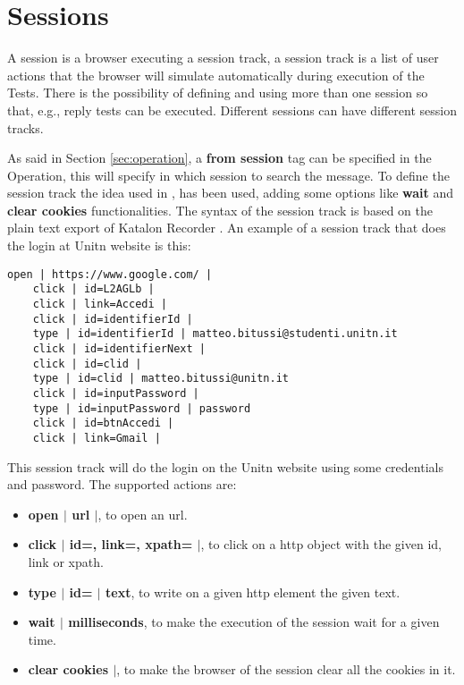 \section{Sessions}
A session is a browser executing a \gls{session track}, a \gls{session track} is a list of user actions that the browser will simulate automatically during execution of the Tests. There is the possibility of defining and using more than one session so that, e.g., reply tests can be executed. Different sessions can have different session tracks.

As said in Section \ref{sec:operation}, a \textbf{from session} tag can be specified in the Operation, this will specify in which session to search the message. To define the \gls{session track} the idea used in \cite{claudio_grisenti,stefano_facchini}, has been used, adding some options like \textbf{wait} and \textbf{clear cookies} functionalities.
The syntax of the \gls{session track} is based on the plain text export of Katalon Recorder \cite{katalon_recorder_syntax}. 
An example of a \gls{session track} that does the login at Unitn website is this:

\begin{lstlisting}[caption=Session track Unitn login]
    open | https://www.google.com/ |
    click | id=L2AGLb |
    click | link=Accedi |
    click | id=identifierId |
    type | id=identifierId | matteo.bitussi@studenti.unitn.it
    click | id=identifierNext |
    click | id=clid |
    type | id=clid | matteo.bitussi@unitn.it
    click | id=inputPassword |
    type | id=inputPassword | password
    click | id=btnAccedi |
    click | link=Gmail |
\end{lstlisting}

This \gls{session track} will do the login on the Unitn website using some credentials and password. The supported actions are:
\begin{itemize}
    \item \textbf{open $|$ url $|$}, to open an url.
    \item \textbf{click $|$ id=, link=, xpath= $|$}, to click on a http object with the given id, link or xpath.
    \item \textbf{type $|$ id= $|$ text}, to write on a given http element the given text.
    \item \textbf{wait $|$ milliseconds}, to make the execution of the session wait for a given time.
    \item \textbf{clear cookies $|$}, to make the browser of the session clear all the cookies in it.
\end{itemize}



